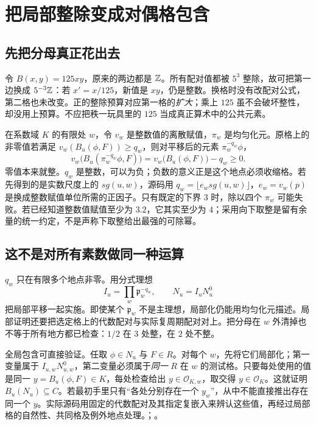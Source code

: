\section{把局部整除变成对偶格包含}
\subsection{先把分母真正花出去}
令 $B(x,y)=125xy$，原来的两边都是 $\mathbb Z$。所有配对值都被 $5^3$ 整除，故可把第一边换成 $5^{-3}\mathbb Z$：若 $x'=x/125$，新值是 $xy$，仍是整数。换格时没有改配对公式，第二格也未改变。正的整除预算对应第一格的\emph{扩大}；乘上 $125$ 虽不会破坏整性，却没用上预算。不应把秩一玩具里的 $125$ 当成真正算术中的公共元素。

在系数域 $K$ 的有限处 $w$，令 $v_w$ 是整数值的离散赋值，$\pi_w$ 是均匀化元。原格上的非零值若满足 $v_w(B_u(\phi,F))\ge q_w$，则对平移后的元素 $\pi_w^{-q_w}\phi$，
\[
 v_w\bigl(B_u(\pi_w^{-q_w}\phi,F)\bigr)
     =v_w\bigl(B_u(\phi,F)\bigr)-q_w\ge0.
\]
零值本来就整。$q_w$ 是整数，可以为负；负数的意义正是这个地点必须收缩格。若先得到的是实数尺度上的 $sg(u,w)$，源码用 $q_w=\lfloor e_w sg(u,w)\rfloor$，$e_w=v_w(p)$ 是换成整数赋值单位所需的正因子。只有既定的下界 $3$ 时，除以四个 $\pi_w$ 可能失败。若已经知道整数值赋值至少为 $3.2$，它其实至少为 $4$；采用向下取整是留有余量的统一约定，不是声称下取整给出最强的可除幂。

\subsection{这不是对所有素数做同一种运算}
$q_w$ 只在有限多个地点非零。用分式理想
\[
   I_u=\prod_w\mathfrak p_w^{-q_w},\qquad N_u=I_uN_u^0
\]
把局部平移一起实施。即使某个 $\mathfrak p_w$ 不是主理想，局部化仍能用均匀化元描述。局部证明还要把选定格上的代数配对与实际复周期配对对上。把分母在 $w$ 外清掉也不等于所有地方都已检查：$1/2$ 在 $3$ 处整，在 $2$ 处不整。

全局包含可直接验证。任取 $\phi\in N_u$ 与 $F\in R$。对每个 $w$，先将它们局部化；第一变量属于 $I_{u,w}N^0_{u,w}$，第二变量必须属于\emph{同一} $R$ 在 $w$ 的测试格。只要每处使用的值是同一 $y=B_u(\phi,F)\in K$，每处检查给出 $y\in\mathcal O_{K,w}$，取交得 $y\in\mathcal O_K$。这就证明 $B_u(N_u)\subseteq C$。若最初手里只有“各处分别存在一个 $y_w$”，从中不能直接推出存在同一个 $y$。实际源码用固定的代数配对及其指定复嵌入来辨认这些值，再经过局部格的自然性、共同格及例外地点处理。；。

